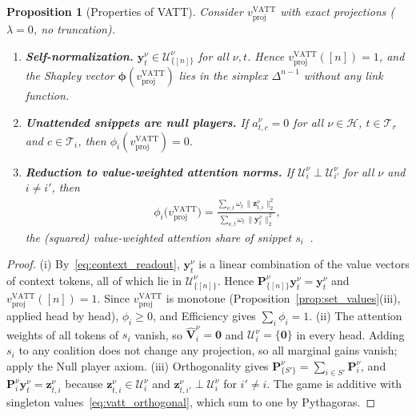 \documentclass{article}
\newtheorem{proposition}{Proposition}
\begin{document}
\begin{proposition}[Properties of VATT]\label{prop:vatt}
Consider $v^{\text{VATT}}_{\text{proj}}$ with exact projections ($\lambda = 0$, no truncation).
\begin{enumerate}
    \item[(i)] \textbf{Self-normalization.} $\mathbf{y}^\nu_t \in \mathcal{U}^\nu_{\{[n]\}}$ for all $\nu, t$. Hence $v^{\text{VATT}}_{\text{proj}}([n]) = 1$, and the Shapley vector $\boldsymbol{\phi}(v^{\text{VATT}}_{\text{proj}})$ lies in the simplex $\Delta^{n-1}$ without any link function.
    \item[(ii)] \textbf{Unattended snippets are null players.} If $a^\nu_{t,c} = 0$ for all $\nu \in \mathcal{H}$, $t \in \mathcal{T}_r$ and $c \in \mathcal{T}_i$, then $\phi_i(v^{\text{VATT}}_{\text{proj}}) = 0$.
    \item[(iii)] \textbf{Reduction to value-weighted attention norms.} If $\mathcal{U}^\nu_i \perp \mathcal{U}^\nu_{i'}$ for all $\nu$ and $i \neq i'$, then
    \begin{align}\label{eq:vatt_orthogonal}
        \phi_i\big(v^{\text{VATT}}_{\text{proj}}\big) = \frac{\sum_{\nu, t} \omega_t \, \|\mathbf{z}^{\nu}_{t,i}\|_2^2}{\sum_{\nu, t} \omega_t \, \|\mathbf{y}^{\nu}_t\|_2^2},
    \end{align}
    the (squared) value-weighted attention share of snippet $s_i$~\cite{kobayashi2020attention}.
\end{enumerate}
\end{proposition}

\begin{proof}
(i) By~\eqref{eq:context_readout}, $\mathbf{y}^\nu_t$ is a linear combination of the value vectors of context tokens, all of which lie in $\mathcal{U}^\nu_{\{[n]\}}$. Hence $\mathbf{P}^\nu_{\{[n]\}} \mathbf{y}^\nu_t = \mathbf{y}^\nu_t$ and $v^{\text{VATT}}_{\text{proj}}([n]) = 1$. Since $v^{\text{VATT}}_{\text{proj}}$ is monotone (Proposition~\ref{prop:set_values}(iii), applied head by head), $\phi_i \ge 0$, and Efficiency gives $\sum_i \phi_i = 1$. (ii) The attention weights of all tokens of $s_i$ vanish, so $\hat{\mathbf{V}}^\nu_i = \mathbf{0}$ and $\mathcal{U}^\nu_i = \{\mathbf{0}\}$ in every head. Adding $s_i$ to any coalition does not change any projection, so all marginal gains vanish; apply the Null player axiom. (iii) Orthogonality gives $\mathbf{P}^\nu_{\{S'\}} = \sum_{i \in S'} \mathbf{P}^\nu_i$, and $\mathbf{P}^\nu_i \mathbf{y}^\nu_t = \mathbf{z}^\nu_{t,i}$ because $\mathbf{z}^\nu_{t,i} \in \mathcal{U}^\nu_i$ and $\mathbf{z}^\nu_{t,i'} \perp \mathcal{U}^\nu_i$ for $i' \neq i$. The game is additive with singleton values~\eqref{eq:vatt_orthogonal}, which sum to one by Pythagoras.
\end{proof}
\end{document}
